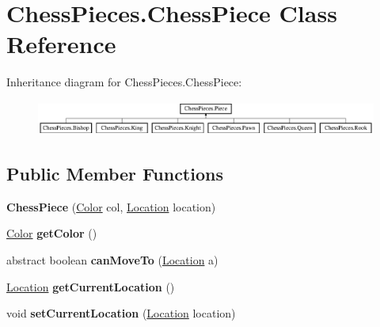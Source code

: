 \hypertarget{class_chess_pieces_1_1_chess_piece}{}\section{Chess\+Pieces.\+Chess\+Piece Class Reference}
\label{class_chess_pieces_1_1_chess_piece}
Inheritance diagram for Chess\+Pieces.\+Chess\+Piece\+:\begin{figure}[H]
\begin{center}
\leavevmode
\includegraphics[height=1.138211cm]{class_chess_pieces_1_1_chess_piece}
\end{center}
\end{figure}
\subsection*{Public Member Functions}
\begin{DoxyCompactItemize}
\item 
{\bfseries Chess\+Piece} (\hyperlink{enum_chess_pieces_1_1_color}{Color} col, \hyperlink{class_chess_pieces_1_1_location}{Location} location)\hypertarget{class_chess_pieces_1_1_chess_piece_a10acb1cf463491453995917870d225c8}{}\label{class_chess_pieces_1_1_chess_piece_a10acb1cf463491453995917870d225c8}

\item 
\hyperlink{enum_chess_pieces_1_1_color}{Color} {\bfseries get\+Color} ()\hypertarget{class_chess_pieces_1_1_chess_piece_a8cb8355750b3807abdad1f33bc43bdf4}{}\label{class_chess_pieces_1_1_chess_piece_a8cb8355750b3807abdad1f33bc43bdf4}

\item 
abstract boolean {\bfseries can\+Move\+To} (\hyperlink{class_chess_pieces_1_1_location}{Location} a)\hypertarget{class_chess_pieces_1_1_chess_piece_ab7ef53d95a6778e8e38bfb07861e4c8f}{}\label{class_chess_pieces_1_1_chess_piece_ab7ef53d95a6778e8e38bfb07861e4c8f}

\item 
\hyperlink{class_chess_pieces_1_1_location}{Location} {\bfseries get\+Current\+Location} ()\hypertarget{class_chess_pieces_1_1_chess_piece_ad4528e4dbde0a85ebc8c46b22871aa5c}{}\label{class_chess_pieces_1_1_chess_piece_ad4528e4dbde0a85ebc8c46b22871aa5c}

\item 
void {\bfseries set\+Current\+Location} (\hyperlink{class_chess_pieces_1_1_location}{Location} location)\hypertarget{class_chess_pieces_1_1_chess_piece_aedb67f5f2980ff23efb75ddbd651464d}{}\label{class_chess_pieces_1_1_chess_piece_aedb67f5f2980ff23efb75ddbd651464d}

\end{DoxyCompactItemize}
